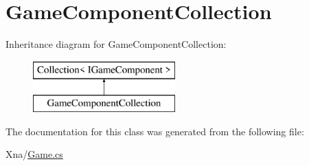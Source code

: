 \hypertarget{classMicrosoft_1_1Xna_1_1Framework_1_1GameComponentCollection}{}\section{Game\+Component\+Collection}
\label{classMicrosoft_1_1Xna_1_1Framework_1_1GameComponentCollection}
Inheritance diagram for Game\+Component\+Collection\+:\begin{figure}[H]
\begin{center}
\leavevmode
\includegraphics[height=2.000000cm]{classMicrosoft_1_1Xna_1_1Framework_1_1GameComponentCollection}
\end{center}
\end{figure}


The documentation for this class was generated from the following file\+:\begin{DoxyCompactItemize}
\item 
Xna/\hyperlink{Game_8cs}{Game.\+cs}\end{DoxyCompactItemize}
